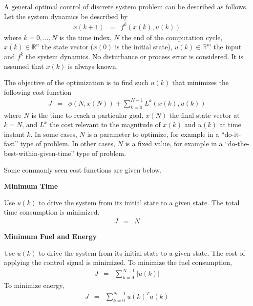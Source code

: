 A general optimal control of discrete system problem can be described as follows. Let the system dynamics be described by
\begin{eqnarray}
  x(k+1) &=& f^k\left(x(k), u(k)\right) \label{eq:optimalrobustcs:generaldynamic}
\end{eqnarray}
where $k=0,\ldots, N$ is the time index, $N$ the end of the computation cycle, $x(k)\in\mathbb{R}^n$ the state vector ($x(0)$ is the initial state), $u(k)\in\mathbb{R}^m$ the input and $f^k$ the system dynamics. No disturbance or process error is considered. It is assumed that $x(k)$ is always known.

The objective of the optimization is to find such $u(k)$ that minimizes the following cost function
\begin{eqnarray}
  J &=& \phi\left(N, x(N)\right) + \sum_{k=0}^{N-1}L^k\left(x(k), u(k)\right) \label{eq:optimalrobustcs:generaldiscrete}
\end{eqnarray}
where $N$ is the time to reach a particular goal, $x(N)$ the final state vector at $k=N$, and $L^k$ the cost relevant to the magnitude of $x(k)$ and $u(k)$ at time instant $k$. In some cases, $N$ is a parameter to optimize, for example in a ``do-it-fast'' type of problem. In other cases, $N$ is a fixed value, for example in a ``do-the-best-within-given-time'' type of problem.

Some commonly seen cost functions are given below.

\vspace{0.1in}
\noindent \textbf{Minimum Time}
\vspace{0.1in}

Use $u(k)$ to drive the system from its initial state to a given state. The total time consumption is minimized.
\begin{eqnarray}
  J &=& N \nonumber
\end{eqnarray}

\vspace{0.1in}
\noindent \textbf{Minimum Fuel and Energy}
\vspace{0.1in}

Use $u(k)$ to drive the system from its initial state to a given state. The cost of applying the control signal is minimized. To minimize the fuel consumption,
\begin{eqnarray}
  J &=& \sum_{k=0}^{N-1} |u(k)| \nonumber
\end{eqnarray}
To minimize energy,
\begin{eqnarray}
  J &=& \sum_{k=0}^{N-1} u(k)^Tu(k) \nonumber
\end{eqnarray}

